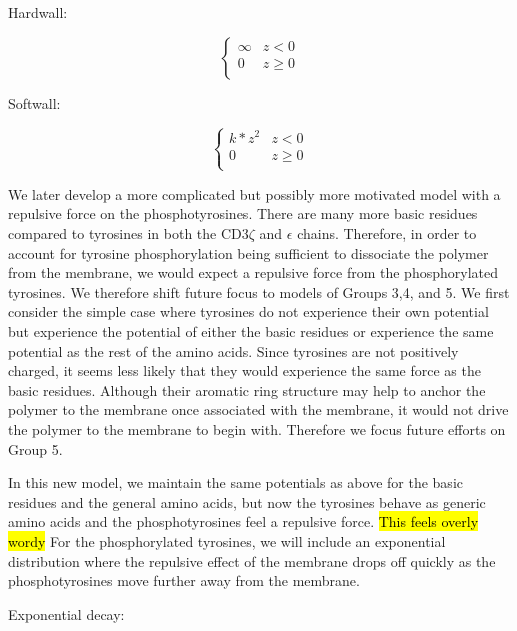 \documentclass[../../AdvancementSummary.tex]{subfiles}
\begin{document}
Hardwall:

\begin{equation}\label{eq: hardwall}
\begin{cases}
\infty 	& z < 0\\
0 & z \geq 0 \\
\end{cases}
\end{equation}


Softwall:

\begin{equation}\label{eq: softwall}
\begin{cases}
k*z^2 	& z < 0\\
0 & z \geq 0 \\
\end{cases}
\end{equation}

We later develop a more complicated but possibly more motivated model with a repulsive force on the phosphotyrosines. There are many more basic residues compared to tyrosines in both the CD3$\zeta$ and $\epsilon$ chains.  Therefore, in order to account for tyrosine phosphorylation being sufficient to dissociate the polymer from the membrane, we would expect a repulsive force from the phosphorylated tyrosines. We therefore shift future focus to models of Groups 3,4, and 5. We first consider the simple case where tyrosines do not experience their own potential but experience the potential of either the basic residues or experience the same potential as the rest of the amino acids.  Since tyrosines are not positively charged, it seems less likely that they would experience the same force as the basic residues.  Although their aromatic ring structure may help to anchor the polymer to the membrane once associated with the membrane, it would not drive the polymer to the membrane to begin with. \cite{Lopez2015} Therefore we focus future efforts on Group 5.

In this new model, we maintain the same potentials as above for the basic residues and the general amino acids, but now the tyrosines behave as generic amino acids and the phosphotyrosines feel a repulsive force. \hl{This feels overly wordy} For the phosphorylated tyrosines, we will include an exponential distribution where the repulsive effect of the membrane drops off quickly as the phosphotyrosines move further away from the membrane.


Exponential decay:

\end{document}
